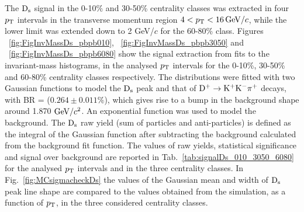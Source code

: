  The ${\rm D_s}$ signal in the 0-10$\%$ and 30-50\% centrality classes was extracted in four $p_{\rm T}$ 
 intervals in the transverse momentum region $4 < p_{\rm T} <16 \, \mathrm{GeV}/c$, while the lower limit was extended down to 2 GeV/$c$
for the 60-80\% class. Figures ~\ref{fig:FigInvMassDs_pbpb010}, ~\ref{fig:FigInvMassDs_pbpb3050} and ~\ref{fig:FigInvMassDs_pbpb6080} show the signal extraction
from fits to the invariant-mass histograms, in the analysed $p_{\rm T}$ intervals
for the 0-10\%, 30-50\% and 60-80\% centrality classes respectively.
The distributions were fitted with two Gaussian functions to model
the ${\rm D_s}$ peak and that of ${\rm D^{+}\to K^+ K^-\pi^+}$ decays, with BR = ($0.264 \pm 0.011\%$),
which gives rise to a bump in the background shape around 1.870 $\mathrm{GeV}/c^{2}$. 
An exponential function was used to model the background.
The ${\rm D_s}$ raw yield (sum of particles and anti-particles) is defined as the integral of the Gaussian function 
after subtracting the background calculated from the 
background fit function. 
The values of raw yields, statistical significance and signal over background are reported in
Tab.~\ref{tab:signalDs_010_3050_6080} for the analysed $p_{\rm T}$ intervals and in the three centrality classes.
In Fig.~\ref{fig:MCsigmacheckDs} the values of the Gaussian mean and width of ${\rm D_s}$ 
peak line shape are compared to the values obtained from the simulation, as a function of $p_{\rm T}$, in the 
three considered centrality classes.

